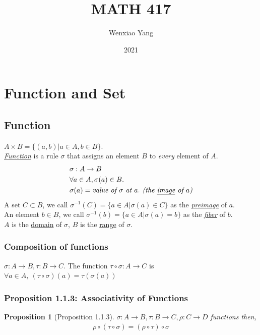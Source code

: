 \documentclass[11pt,a4paper]{article}
\title{MATH 417}
\author[*]{Wenxiao Yang}
\affil[*]{Department of Mathematics, University of Illinois at Urbana-Champaign}
\date{2021}
\newtheorem{proposition}{Proposition}
\begin{document}
\maketitle
\tableofcontents
\newpage



\section{Function and Set}
\subsection{Function}
\noindent $A\times B=\{(a,b)|a\in A, b\in B\}$.\\
\underline{\textit{Function}} is a rule $\sigma$ that assigns an element $B$ to \textit{every} element of $A$.
\begin{equation}
    \begin{aligned}
    &\sigma:A\rightarrow B\\
    & \forall a\in A, \sigma(a)\in B.\\
    & \sigma (a)= \textit{value of } \sigma\textit{ at } a. \textit{ (the \underline{image} of $a$)}
    \end{aligned}
    \nonumber
\end{equation}
A set $C\subset B$, we call $\sigma^{-1}(C)=\{a\in A| \sigma(a)\in C\}$ as the \textit{\underline{preimage}} of $a$.\\
An element $b\in B$, we call $\sigma^{-1}(b)=\{a\in A| \sigma(a)=b \}$ as the \textit{\underline{fiber}} of $b$.\\
$A$ is the \underline{domain} of $\sigma$, $B$ is the \underline{range} of $\sigma$.

\subsubsection{Composition of functions}
$\sigma: A\rightarrow B, \tau: B\rightarrow C$. The function $\tau\circ \sigma:A\rightarrow C$ is $\forall a\in A,\ (\tau\circ \sigma)(a)=\tau( \sigma(a))$

\subsubsection{Proposition 1.1.3: Associativity of Functions}
\begin{proposition}[Proposition 1.1.3]
    $\sigma:A \rightarrow B, \tau:B \rightarrow C, \rho:C \rightarrow D$ functions then,
    \begin{equation}
        \begin{aligned}
            \rho\circ(\tau\circ\sigma)=(\rho\circ\tau)\circ\sigma
        \end{aligned}
        \nonumber
    \end{equation}
\end{proposition}
\end{document}
